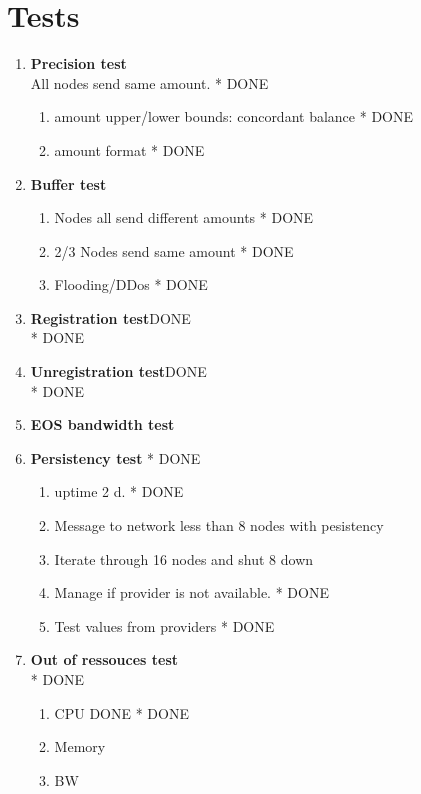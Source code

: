 \documentclass[]{article}
\begin{document}
\section{Tests}

					\begin{enumerate}
					\item \textbf{Precision test}\\
					All nodes send same amount. 	* {\color{green} DONE}
						\begin{enumerate}
						\item amount upper/lower bounds: concordant balance 	*	 {\color{green} DONE}
						\item amount format  	*	 {\color{green} DONE}
						\end{enumerate}
					\item \textbf{Buffer test}\\
					\begin{enumerate}
						\item Nodes all send different amounts 	*	 {\color{green} DONE}
						\item 2/3 Nodes send same amount 	* {\color{green} DONE}
						\item Flooding/DDos 	*  {	\color{green} DONE}
					\end{enumerate}
						\item \textbf{Registration test}DONE\\ 	*	 {\color{green} DONE}
						\item \textbf{Unregistration test}DONE\\	*	 {\color{green} DONE}
						\item \textbf{EOS bandwidth test}\\
						\item \textbf{Persistency test} 	*	 {\color{green} DONE}
							\begin{enumerate}
								\item uptime\textit{} 2 d. 	*	 {\color{green} DONE}
								\item Message to network less than 8 nodes with pesistency 
								\item Iterate through 16 nodes and shut 8 down
								\item Manage if provider is not available. 	* {\color{green} DONE}
								\item Test values from providers 	*	 {\color{green} DONE}
							\end{enumerate}
						\item \textbf{Out of ressouces test}\\ 	*	 {\color{green} DONE}
						\begin{enumerate}
							\item CPU DONE 	*	 {\color{green} DONE}
							\item Memory 
							\item BW
						\end{enumerate}  
				\end{enumerate}
\end{document}
